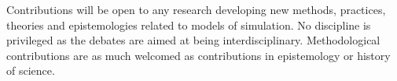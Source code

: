 \documentclass[11pt]{article}
\begin{document}
Contributions will be open to any research developing new methods, practices, theories and epistemologies related to models of simulation. No discipline is privileged as the debates are aimed at being interdisciplinary. Methodological contributions are as much welcomed as contributions in epistemology or history of science.

\end{document}
